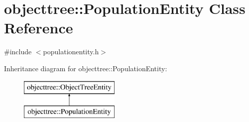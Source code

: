 \hypertarget{classobjecttree_1_1_population_entity}{}\section{objecttree\+::Population\+Entity Class Reference}
\label{classobjecttree_1_1_population_entity}


{\ttfamily \#include $<$populationentity.\+h$>$}

Inheritance diagram for objecttree\+::Population\+Entity\+:\begin{figure}[H]
\begin{center}
\leavevmode
\includegraphics[height=2.000000cm]{df/d60/classobjecttree_1_1_population_entity}
\end{center}
\end{figure}
